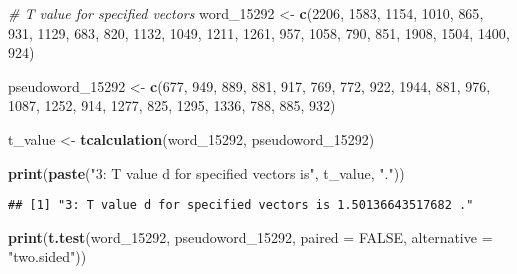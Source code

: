 \documentclass[
]{article}
\newenvironment{Shaded}{\begin{snugshade}}{\end{snugshade}}
\newcommand{\AttributeTok}[1]{\textcolor[rgb]{0.13,0.29,0.53}{#1}}
\newcommand{\CommentTok}[1]{\textcolor[rgb]{0.56,0.35,0.01}{\textit{#1}}}
\newcommand{\ConstantTok}[1]{\textcolor[rgb]{0.56,0.35,0.01}{#1}}
\newcommand{\DecValTok}[1]{\textcolor[rgb]{0.00,0.00,0.81}{#1}}
\newcommand{\FunctionTok}[1]{\textcolor[rgb]{0.13,0.29,0.53}{\textbf{#1}}}
\newcommand{\NormalTok}[1]{#1}
\newcommand{\OtherTok}[1]{\textcolor[rgb]{0.56,0.35,0.01}{#1}}
\newcommand{\StringTok}[1]{\textcolor[rgb]{0.31,0.60,0.02}{#1}}
\begin{document}
\begin{Shaded}
\begin{Highlighting}[]
\CommentTok{\# T value for specified vectors}
\NormalTok{word\_15292 }\OtherTok{\textless{}{-}} \FunctionTok{c}\NormalTok{(}\DecValTok{2206}\NormalTok{, }\DecValTok{1583}\NormalTok{, }\DecValTok{1154}\NormalTok{, }\DecValTok{1010}\NormalTok{,  }\DecValTok{865}\NormalTok{,  }\DecValTok{931}\NormalTok{, }\DecValTok{1129}\NormalTok{,  }\DecValTok{683}\NormalTok{,  }\DecValTok{820}\NormalTok{, }\DecValTok{1132}\NormalTok{, }\DecValTok{1049}\NormalTok{, }\DecValTok{1211}\NormalTok{, }\DecValTok{1261}\NormalTok{, }\DecValTok{957}\NormalTok{, }\DecValTok{1058}\NormalTok{,  }\DecValTok{790}\NormalTok{,  }\DecValTok{851}\NormalTok{, }\DecValTok{1908}\NormalTok{, }\DecValTok{1504}\NormalTok{, }\DecValTok{1400}\NormalTok{,  }\DecValTok{924}\NormalTok{)}

\NormalTok{pseudoword\_15292 }\OtherTok{\textless{}{-}} \FunctionTok{c}\NormalTok{(}\DecValTok{677}\NormalTok{,  }\DecValTok{949}\NormalTok{,  }\DecValTok{889}\NormalTok{,  }\DecValTok{881}\NormalTok{,  }\DecValTok{917}\NormalTok{,  }\DecValTok{769}\NormalTok{,  }\DecValTok{772}\NormalTok{,  }\DecValTok{922}\NormalTok{, }\DecValTok{1944}\NormalTok{,  }\DecValTok{881}\NormalTok{,  }\DecValTok{976}\NormalTok{, }\DecValTok{1087}\NormalTok{, }\DecValTok{1252}\NormalTok{,  }\DecValTok{914}\NormalTok{, }\DecValTok{1277}\NormalTok{,  }\DecValTok{825}\NormalTok{, }\DecValTok{1295}\NormalTok{, }\DecValTok{1336}\NormalTok{,  }\DecValTok{788}\NormalTok{,  }\DecValTok{885}\NormalTok{,  }\DecValTok{932}\NormalTok{)}

\NormalTok{t\_value }\OtherTok{\textless{}{-}} \FunctionTok{tcalculation}\NormalTok{(word\_15292, pseudoword\_15292)}

\FunctionTok{print}\NormalTok{(}\FunctionTok{paste}\NormalTok{(}\StringTok{"3: T value d for specified vectors is"}\NormalTok{, t\_value, }\StringTok{"."}\NormalTok{))}
\end{Highlighting}
\end{Shaded}

\begin{verbatim}
## [1] "3: T value d for specified vectors is 1.50136643517682 ."
\end{verbatim}

\begin{Shaded}
\begin{Highlighting}[]
\FunctionTok{print}\NormalTok{(}\FunctionTok{t.test}\NormalTok{(word\_15292, pseudoword\_15292,  }\AttributeTok{paired =} \ConstantTok{FALSE}\NormalTok{, }\AttributeTok{alternative =} \StringTok{"two.sided"}\NormalTok{))}
\end{Highlighting}
\end{Shaded}
\end{document}
